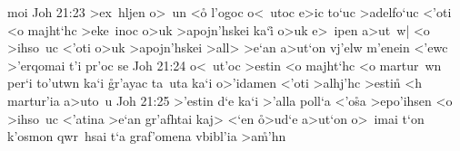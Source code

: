 moi\bibvsend
\vs Joh 21:23
>ex~hljen
o>~un
<o\r{}
l'ogoc
o<~utoc
e>ic
to`uc
>adelfo`uc
<'oti
<o
majht`hc
>eke~inoc
o>uk
>apojn'hskei
ka`i\r{}
o>uk
e>~ipen
a>ut~w|
<o
>ihso~uc
<'oti
o>uk
>apojn'hskei
>all>
>e`an
a>ut`on
vj'elw
m'enein
<'ewc
>'erqomai
t'i
pr'oc
se\bibvsend
\vs Joh 21:24
o<~ut'oc
>estin
<o
majht`hc
<o
martur~wn
per`i
to'utwn
ka`i
\r{g}r'ayac
ta~uta
ka`i
o>'idamen
<'oti
>alhj'hc
>estin\r{}
<h
martur'ia
a>uto~u\bibvsend
\vs Joh 21:25
>'estin
d`e
ka`i
>'alla
poll`a
<'o\r{s}a
>epo'ihsen
<o
>ihso~uc
<'atina
>e`an
gr'afhtai
kaj>
<`en
\r{o}>ud`e
a>ut`on
o>~imai
t`on
k'osmon
qwr~hsai
t`a
graf'omena
vbibl'ia
>a\r{m}'hn\bibvsend
{}
